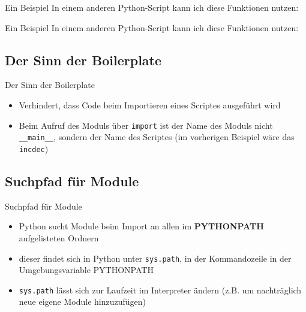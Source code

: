 \begin{frame}{Ein Beispiel}
	In einem anderen Python-Script kann ich diese Funktionen nutzen:
	
\end{frame}

\begin{frame}{Ein Beispiel}
	In einem anderen Python-Script kann ich diese Funktionen nutzen:
	
\end{frame}

\subsection{Der Sinn der Boilerplate}
\begin{frame}{Der Sinn der Boilerplate}
	\begin{itemize}
		\item Verhindert, dass Code beim Importieren eines Scriptes ausgef\"uhrt wird
		\item Beim Aufruf des Moduls \"uber \texttt{import} ist der Name des Moduls \alert{nicht \texttt{\_\_main\_\_}}, sondern der Name des Scriptes (im vorherigen Beispiel w\"are das \texttt{incdec})
	\end{itemize}
\end{frame}



\subsection{Suchpfad f\"ur Module}
\begin{frame}{Suchpfad f\"ur Module}
	\begin{itemize}
		\item Python sucht Module beim Import an allen im \alert{\textbf{PYTHONPATH}} aufgelisteten Ordnern
		\item dieser findet sich in Python unter \alert{\texttt{sys.path}}, in der Kommandozeile in der Umgebungsvariable PYTHONPATH
		\item \texttt{sys.path} l\"asst sich zur Laufzeit im Interpreter \"andern (z.B. um nachtr\"aglich neue eigene Module hinzuzuf\"ugen)
	\end{itemize}
\end{frame}

